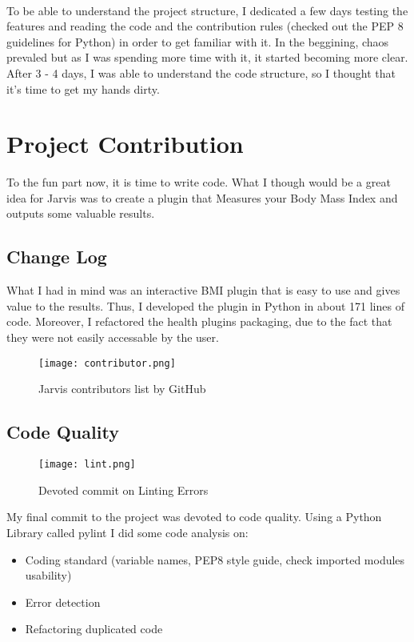 \documentclass[12pt]{article}
\begin{document}
\paragraph{}
  To be able to understand the project structure, I dedicated a few days testing the features and reading the code and the contribution rules (checked out the PEP 8 guidelines for Python) in order to get familiar with it. In the beggining, chaos prevaled but as I was spending more time with it, it started becoming more clear. After 3 - 4 days, I was able to understand the code structure, so I thought that it's time to get my hands dirty.

\section{Project Contribution}

  To the fun part now, it is time to write code. What I though would be a great idea for Jarvis was to create a plugin that Measures your Body Mass Index and outputs some valuable results.    
  
  \subsection{Change Log}
  
  What I had in mind was an interactive BMI plugin that is easy to use and gives value to the results. Thus, I developed the plugin in Python in about 171 lines of code. Moreover, I refactored the health plugins packaging, due to the fact that they were not easily accessable by the user.
  
\begin{figure}[tph!]
\centerline{\texttt{[image: contributor.png]}}
    \caption{Jarvis contributors list by GitHub}
    \label{fig:verticalcell}
\end{figure}
  
  \subsection{Code Quality}
  
  \begin{figure}[tph!]
\centerline{\texttt{[image: lint.png]}}
    \caption{Devoted commit on Linting Errors}
    \label{fig:verticalcell}
\end{figure}
  
    My final commit to the project was devoted to code quality. Using a Python Library called pylint I did some code analysis on:
    \begin{itemize}
    \item Coding standard (variable names, PEP8 style guide, check imported modules usability)
    \item Error detection
    \item Refactoring duplicated code
    \end{itemize}
    
\end{document}

